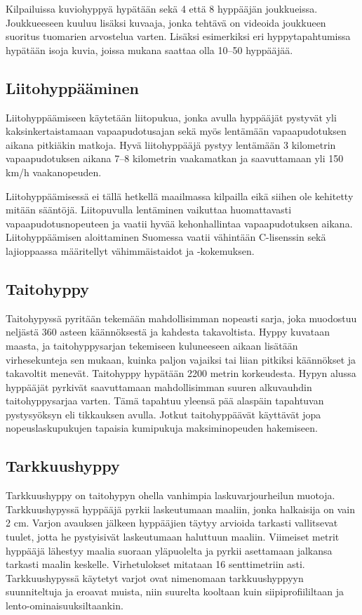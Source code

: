 Kilpailuissa kuviohyppyä hypätään sekä 4 että 8 hyppääjän joukkueissa. Joukkueeseen kuuluu lisäksi kuvaaja, jonka tehtävä on videoida joukkueen suoritus tuomarien arvostelua varten. Lisäksi esimerkiksi eri hyppytapahtumissa hypätään isoja kuvia, joissa mukana saattaa olla 10–50 hyppääjää. 

\subsection{ Liitohyppääminen }
\label{erikoishypyt-liitohyppaaminen}


Liitohyppäämiseen käytetään liitopukua, jonka avulla hyppääjät pystyvät yli kaksinkertaistamaan vapaapudotusajan sekä myös lentämään vapaapudotuksen aikana pitkiäkin matkoja. Hyvä liitohyppääjä pystyy lentämään 3 kilometrin vapaapudotuksen aikana 7–8 kilometrin vaakamatkan ja saavuttamaan yli 150 km/h vaakanopeuden.  


Liitohyppäämisessä ei tällä hetkellä maailmassa kilpailla eikä siihen ole kehitetty mitään sääntöjä. Liitopuvulla lentäminen vaikuttaa huomattavasti vapaapudotusnopeuteen ja vaatii hyvää kehonhallintaa vapaapudotuksen aikana. Liitohyppäämisen aloittaminen Suomessa vaatii vähintään C-lisenssin sekä lajioppaassa määritellyt vähimmäistaidot ja -kokemuksen. 

\subsection{ Taitohyppy }
\label{erikoishypyt-taitohyppy}


Taitohypyssä pyritään tekemään mahdollisimman nopeasti sarja, joka muodostuu neljästä 360 asteen käännöksestä ja kahdesta takavoltista. Hyppy kuvataan maasta, ja taitohyppysarjan tekemiseen kuluneeseen aikaan lisätään virhesekunteja sen mukaan, kuinka paljon vajaiksi tai liian pitkiksi käännökset ja takavoltit menevät. Taitohyppy hypätään 2200 metrin korkeudesta. Hypyn alussa hyppääjät pyrkivät saavuttamaan mahdollisimman suuren alkuvauhdin taitohyppysarjaa varten. Tämä tapahtuu yleensä pää alaspäin tapahtuvan pystysyöksyn eli tikkauksen avulla. Jotkut taitohyppäävät käyttävät jopa nopeuslaskupukujen tapaisia kumipukuja maksiminopeuden hakemiseen. 

\subsection{ Tarkkuushyppy }
\label{erikoishypyt-tarkkuushyppy}


Tarkkuushyppy on taitohypyn ohella vanhimpia laskuvarjourheilun muotoja. Tarkkuushypyssä hyppääjä pyrkii laskeutumaan maaliin, jonka halkaisija on vain 2 cm. Varjon avauksen jälkeen hyppääjien täytyy arvioida tarkasti vallitsevat tuulet, jotta he pystyisivät laskeutumaan haluttuun maaliin. Viimeiset metrit hyppääjä lähestyy maalia suoraan yläpuolelta ja pyrkii asettamaan jalkansa tarkasti maalin keskelle. Virhetulokset mitataan 16 senttimetriin asti. Tarkkuushypyssä käytetyt varjot ovat nimenomaan tarkkuushyppyyn suunniteltuja ja eroavat muista, niin suurelta kooltaan kuin siipiprofiililtaan ja lento-ominaisuuksiltaankin. 


